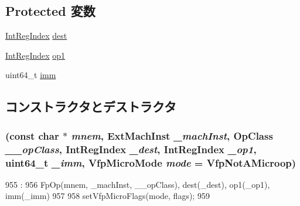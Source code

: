 \subsection*{Protected 変数}
\begin{DoxyCompactItemize}
\item 
\hyperlink{namespaceArmISA_ae64680ba9fb526106829d6bf92fc791b}{IntRegIndex} \hyperlink{classArmISA_1_1FpRegRegImmOp_aec72e8e45bdc87abeeeb75d2a8a9a716}{dest}
\item 
\hyperlink{namespaceArmISA_ae64680ba9fb526106829d6bf92fc791b}{IntRegIndex} \hyperlink{classArmISA_1_1FpRegRegImmOp_a4c465c43ad568f8bcf8ae71480e9cfea}{op1}
\item 
uint64\_\-t \hyperlink{classArmISA_1_1FpRegRegImmOp_a2b4406ad2843b5aa12d244d01d8fdc69}{imm}
\end{DoxyCompactItemize}


\subsection{コンストラクタとデストラクタ}
\hypertarget{classArmISA_1_1FpRegRegImmOp_aa89d1706daafa0e03a6b9d846a631f61}{
\subsubsection[{FpRegRegImmOp}]{ (const char $\ast$ {\em mnem}, \/  {\bf ExtMachInst} {\em \_\-machInst}, \/  OpClass {\em \_\-\_\-opClass}, \/  {\bf IntRegIndex} {\em \_\-dest}, \/  {\bf IntRegIndex} {\em \_\-op1}, \/  uint64\_\-t {\em \_\-imm}, \/  {\bf VfpMicroMode} {\em mode} = {\ttfamily VfpNotAMicroop})}}
\label{classArmISA_1_1FpRegRegImmOp_aa89d1706daafa0e03a6b9d846a631f61}



\begin{DoxyCode}
955                                                                      :
956         FpOp(mnem, _machInst, __opClass), dest(_dest), op1(_op1), imm(_imm)
957     {
958         setVfpMicroFlags(mode, flags);
959     }

\end{DoxyCode}


